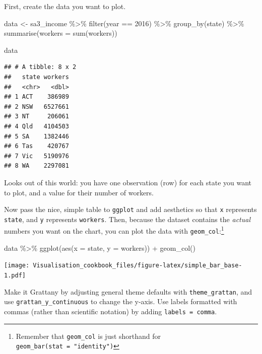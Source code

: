 \documentclass[
]{book}
\newenvironment{Shaded}{\begin{snugshade}}{\end{snugshade}}
\newcommand{\AttributeTok}[1]{\textcolor[rgb]{0.77,0.63,0.00}{#1}}
\newcommand{\DecValTok}[1]{\textcolor[rgb]{0.00,0.00,0.81}{#1}}
\newcommand{\FunctionTok}[1]{\textcolor[rgb]{0.00,0.00,0.00}{#1}}
\newcommand{\NormalTok}[1]{#1}
\newcommand{\OtherTok}[1]{\textcolor[rgb]{0.56,0.35,0.01}{#1}}
\newcommand{\SpecialCharTok}[1]{\textcolor[rgb]{0.00,0.00,0.00}{#1}}
\begin{document}
First, create the data you want to plot.

\begin{Shaded}
\begin{Highlighting}[]
\NormalTok{data }\OtherTok{\textless{}{-}}\NormalTok{ sa3\_income }\SpecialCharTok{\%\textgreater{}\%} 
  \FunctionTok{filter}\NormalTok{(year }\SpecialCharTok{==} \DecValTok{2016}\NormalTok{) }\SpecialCharTok{\%\textgreater{}\%} 
  \FunctionTok{group\_by}\NormalTok{(state) }\SpecialCharTok{\%\textgreater{}\%} 
  \FunctionTok{summarise}\NormalTok{(}\AttributeTok{workers =} \FunctionTok{sum}\NormalTok{(workers))}

\NormalTok{data}
\end{Highlighting}
\end{Shaded}

\begin{verbatim}
## # A tibble: 8 x 2
##   state workers
##   <chr>   <dbl>
## 1 ACT    386989
## 2 NSW   6527661
## 3 NT     206061
## 4 Qld   4104503
## 5 SA    1382446
## 6 Tas    420767
## 7 Vic   5190976
## 8 WA    2297081
\end{verbatim}

Looks out of this world: you have one observation (row) for each state you want to plot, and a value for their number of workers.

Now pass the nice, simple table to \texttt{ggplot} and add aesthetics so that \texttt{x} represents \texttt{state}, and \texttt{y} represents \texttt{workers}. Then, because the dataset contains the \emph{actual} numbers you want on the chart, you can plot the data with \texttt{geom\_col}:\footnote{Remember that \texttt{geom\_col} is just shorthand for \texttt{geom\_bar(stat\ =\ "identity")}}

\begin{Shaded}
\begin{Highlighting}[]
\NormalTok{data }\SpecialCharTok{\%\textgreater{}\%} 
  \FunctionTok{ggplot}\NormalTok{(}\FunctionTok{aes}\NormalTok{(}\AttributeTok{x =}\NormalTok{ state,}
             \AttributeTok{y =}\NormalTok{ workers)) }\SpecialCharTok{+} 
  \FunctionTok{geom\_col}\NormalTok{()}
\end{Highlighting}
\end{Shaded}

\texttt{[image: Visualisation\_cookbook\_files/figure-latex/simple\_bar\_base-1.pdf]}

Make it Grattany by adjusting general theme defaults with \texttt{theme\_grattan}, and use \texttt{grattan\_y\_continuous} to change the y-axis. Use labels formatted with commas (rather than scientific notation) by adding \texttt{labels\ =\ comma}.
\end{document}
